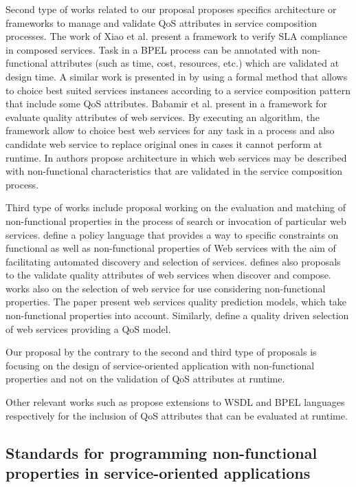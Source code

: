Second type of works related to our proposal proposes specifics architecture or frameworks to manage and validate QoS attributes in service composition processes. The work of Xiao et al. \cite{XiaoCZBOLH08} present a framework to verify SLA compliance in composed services. Task in a BPEL process can be annotated with non-functional attributes (such as time, cost, resources, etc.) which are validated at design time. A similar work is presented in \cite{SchmelingCM11} by using a formal method that allows to choice best suited services instances according to a service composition pattern that include some QoS attributes. Babamir et al. present in \cite{Babamir2010} a framework for evaluate quality attributes of web services. By executing an algorithm, the framework allow to choice best web services for any task in a process and also candidate web service to replace original ones in cases it cannot perform at runtime. In \cite{Karunamurthy2012787} authors propose architecture in which web services may be described with non-functional characteristics that are validated in the service composition process.

Third type of works include proposal working on the evaluation and matching of non-functional properties in the process of search or invocation of particular web services.\cite{AgarwalLS09} define a policy language that provides a way to specific constraints on functional as well as non-functional properties of Web services with the aim of facilitating automated discovery and selection of services.\cite{JeongCL09,Kamalabad2012} defines also proposals to the validate quality attributes of web services when discover and compose.\cite{MohantyRP10} works also on the selection of web service for use considering non-functional properties. The paper present web services quality prediction models, which take non-functional properties into account. Similarly, \cite{Yeom2006} define a quality driven selection of web services providing a QoS model.

Our proposal by the contrary to the second and third type of proposals is focusing on the design of service-oriented application with non-functional properties and not on the validation of QoS attributes at runtime.

Other relevant works such as \cite{DAmbrogio06,Liu20121080} propose extensions to WSDL and BPEL languages respectively for the inclusion of QoS attributes that can be evaluated at runtime.

\subsection{Standards for programming non-func\-tion\-al properties in service-oriented applications}

